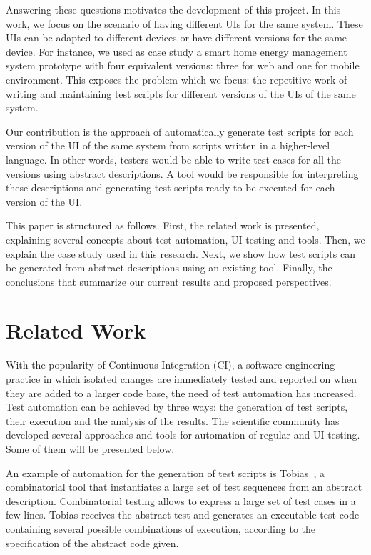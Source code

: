\documentclass{chi-ext}
\begin{document}
Answering these questions motivates the development of this project. In this work, we focus on the scenario of having different UIs for the same system. These UIs can be adapted to different devices or have different versions for the same device. For instance, we used as case study a smart home energy management system prototype with four equivalent versions: three for web and one for mobile environment. This exposes the problem which we focus: the repetitive work of writing and maintaining test scripts for different versions of the UIs of the same system.

Our contribution is the approach of automatically generate test scripts for each version of the UI of the same system from scripts written in a higher-level language. In other words, testers would be able to write test cases for all the versions using abstract descriptions. A tool would be responsible for interpreting these descriptions and generating test scripts ready to be executed for each version of the UI.

This paper is structured as follows. First, the related work is presented, explaining several concepts about test automation, UI testing and tools. Then, we explain the case study used in this research. Next, we show how test scripts can be generated from abstract descriptions using an existing tool. Finally, the conclusions that summarize our current results and proposed perspectives.

\section{Related Work}
With the popularity of Continuous Integration (CI), a software engineering practice in which isolated changes are immediately tested and reported on when they are added to a larger code base, the need of test automation has increased. Test automation can be achieved by three ways: the generation of test scripts, their execution and the analysis of the results. The scientific community has developed several approaches and tools for automation of regular and UI testing. Some of them will be presented below.

An example of automation for the generation of test scripts is Tobias~\cite{tobias}, a combinatorial tool that instantiates a large set of test sequences from an abstract description. Combinatorial testing allows to express a large set of test cases in a few lines. Tobias receives the abstract test and generates an executable test code containing several possible combinations of execution, according to the specification of the abstract code given. 
\end{document}
